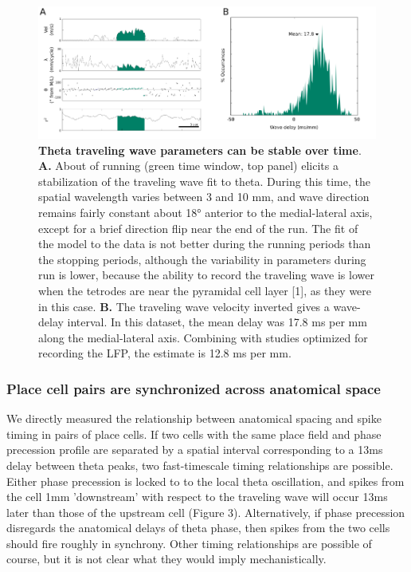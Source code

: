 \documentclass[]{article}
\begin{document}
\begin{figure}[htbp]
\centering
\includegraphics{./finalFigs/waveTimecourse.png}
\caption{\textbf{Theta traveling wave parameters can be stable over time}.
\textbf{A.} About of running (green time window, top panel) elicits a
stabilization of the traveling wave fit to theta. During this time, the
spatial wavelength varies between 3 and 10 mm, and wave direction
remains fairly constant about 18° anterior to the medial-lateral axis,
except for a brief direction flip near the end of the run. The fit of
the model to the data is not better during the running periods than the
stopping periods, although the variability in parameters during run is
lower, because the ability to record the traveling wave is lower when
the tetrodes are near the pyramidal cell layer {[}1{]}, as they were in
this case. \textbf{B.} The traveling wave velocity inverted gives a
wave-delay interval. In this dataset, the mean delay was 17.8 ms per mm
along the medial-lateral axis. Combining with studies optimized for
recording the LFP, the estimate is 12.8 ms per mm.}
\end{figure}

\subsubsection{Place cell pairs are synchronized across anatomical
space}

We directly measured the relationship between anatomical spacing and
spike timing in pairs of place cells. If two cells with the same place
field and phase precession profile are separated by a spatial interval
corresponding to a 13ms delay between theta peaks, two fast-timescale
timing relationships are possible. Either phase precession is locked to
to the local theta oscillation, and spikes from the cell 1mm
'downstream' with respect to the traveling wave will occur 13ms later
than those of the upstream cell (Figure 3). Alternatively, if phase
precession disregards the anatomical delays of theta phase, then spikes
from the two cells should fire roughly in synchrony. Other timing
relationships are possible of course, but it is not clear what they
would imply mechanistically.
\end{document}
